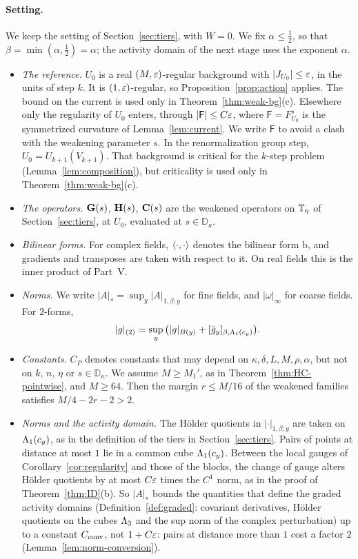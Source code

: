 \paragraph{Setting.} We keep the setting of Section~\ref{sec:tiers}, with $W=0$. We fix $\alpha\le\frac12$, so that $\beta=\min(\alpha,\frac12)=\alpha$; the activity domain of the next stage uses the exponent $\alpha$.
\begin{itemize}
\item \emph{The reference.} $U_0$ is a real $(M,\varepsilon)$-regular background with $|J_{U_0}|\le\varepsilon$, in the units of step $k$. It is $(1,\varepsilon)$-regular, so Proposition~\ref{prop:action} applies. The bound on the current is used only in Theorem~\ref{thm:weak-bg}(c). Elsewhere only the regularity of $U_0$ enters, through $|\mathsf F|\le C\varepsilon$, where $\mathsf F=F^s_{U_0}$ is the symmetrized curvature of Lemma~\ref{lem:current}. We write $\mathsf F$ to avoid a clash with the weakening parameter $s$. In the renormalization group step, $U_0=U_{k+1}(V_{k+1})$. That background is critical for the $k$-step problem (Lemma~\ref{lem:composition}), but criticality is used only in Theorem~\ref{thm:weak-bg}(c).
\item \emph{The operators.} $\mathbf G(s)$, $\mathbf H(s)$, $\mathbf C(s)$ are the weakened operators on $\mathbb T_\eta$ of Section~\ref{sec:tiers}, at $U_0$, evaluated at $s\in\mathbb D_\kappa$.
\item \emph{Bilinear forms.} For complex fields, $\langle \cdot,\cdot\rangle$ denotes the bilinear form $\mathrm b$, and gradients and transposes are taken with respect to it. On real fields this is the inner product of Part~V.
\item \emph{Norms.} We write $|A|_*=\sup_y|A|_{1,\beta;y}$ for fine fields, and $|\omega|_\infty$ for coarse fields. For $2$-forms,
\[
|g|_{(2)}=\sup_y\big(|g|_{B(y)}+[\tilde g_y]_{\beta,\Lambda_1(c_y)}\big).
\]
\item \emph{Constants.} $C_P$ denotes constants that may depend on $\kappa,\delta,L,M,\rho,\alpha$, but not on $k$, $n$, $\eta$ or $s\in\mathbb D_\kappa$. We assume $M\ge M_1'$, as in Theorem~\ref{thm:HC-pointwise}, and $M\ge64$. Then the margin $r\le M/16$ of the weakened families satisfies $M/4-2r-2>2$.
\item \emph{Norms and the activity domain.} The H\"older quotients in $|\cdot|_{1,\beta;y}$ are taken on $\Lambda_1(c_y)$, as in the definition of the tiers in Section~\ref{sec:tiers}. Pairs of points at distance at most $1$ lie in a common cube $\Lambda_1(c_y)$. Between the local gauges of Corollary~\ref{cor:regularity} and those of the blocks, the change of gauge alters H\"older quotients by at most $C\varepsilon$ times the $C^1$ norm, as in the proof of Theorem~\ref{thm:ID}(b). So $|A|_*$ bounds the quantities that define the graded activity domains (Definition~\ref{def:graded}: covariant derivatives, H\"older quotients on the cubes $\Lambda_3$ and the sup norm of the complex perturbation) up to a constant $C_{\rm conv}$, not $1+C\varepsilon$: pairs at distance more than $1$ cost a factor $2$ (Lemma~\ref{lem:norm-conversion}).
\end{itemize}

